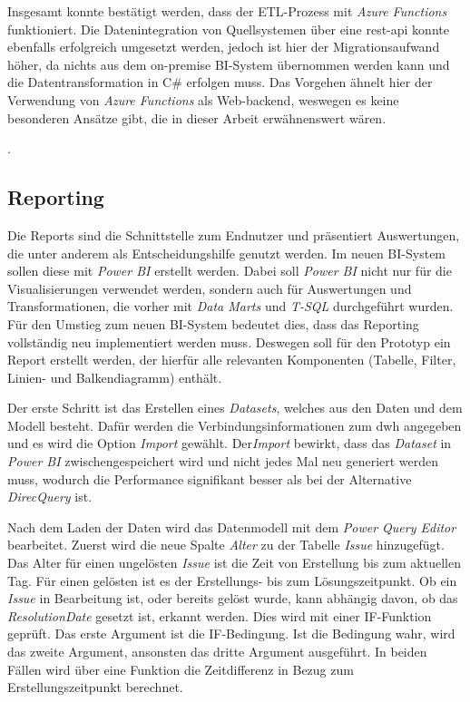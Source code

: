 Insgesamt konnte bestätigt werden, dass der ETL-Prozess mit \textit{Azure Functions} funktioniert. Die Datenintegration von Quellsystemen über eine \ac{rest}-\ac{api} konnte ebenfalls erfolgreich umgesetzt werden, jedoch ist hier der Migrationsaufwand höher, da nichts aus dem on-premise BI-System übernommen werden kann und die Datentransformation in C\# erfolgen muss. Das Vorgehen ähnelt hier der Verwendung von \textit{Azure Functions} als Web-backend, weswegen es keine besonderen Ansätze gibt, die in dieser Arbeit erwähnenswert wären.

\cite[vgl.][]{kurniawan_practical_2019, satapathi_hands-azure_2021, sreeram_azure_2020}.

\subsection{Reporting}
Die Reports sind die Schnittstelle zum Endnutzer und präsentiert Auswertungen, die unter anderem als Entscheidungshilfe genutzt werden. Im neuen BI-System sollen diese mit \textit{Power BI} erstellt werden. Dabei soll \textit{Power BI} nicht nur für die Visualisierungen verwendet werden, sondern auch für Auswertungen und Transformationen, die vorher mit \textit{Data Marts} und \textit{T-SQL} durchgeführt wurden. Für den Umstieg zum neuen BI-System bedeutet dies, dass das Reporting vollständig neu implementiert werden muss. Deswegen soll für den Prototyp ein Report erstellt werden, der hierfür alle relevanten Komponenten (Tabelle, Filter, Linien- und Balkendiagramm) enthält.

Der erste Schritt ist das Erstellen eines \textit{Datasets}, welches aus den Daten und dem Modell besteht. Dafür werden die Verbindungsinformationen zum \ac{dwh} angegeben und es wird die Option \textit{Import} gewählt. Der\textit{Import} bewirkt, dass das \textit{Dataset} in \textit{Power BI} zwischengespeichert wird und nicht jedes Mal neu generiert werden muss, wodurch die Performance signifikant besser als bei der Alternative \textit{DirecQuery} ist.

Nach dem Laden der Daten wird das Datenmodell mit dem \textit{Power Query Editor} bearbeitet. Zuerst wird die neue Spalte \textit{Alter} zu der Tabelle \textit{Issue} hinzugefügt. Das Alter für einen ungelösten \textit{Issue} ist die Zeit von Erstellung bis zum aktuellen Tag. Für einen gelösten ist es der Erstellungs- bis zum Lösungszeitpunkt. Ob ein \textit{Issue} in Bearbeitung ist, oder bereits gelöst wurde, kann abhängig davon, ob das \textit{ResolutionDate} gesetzt ist, erkannt werden. Dies wird mit einer IF-Funktion geprüft. Das erste Argument ist die IF-Bedingung. Ist die Bedingung wahr, wird das zweite Argument, ansonsten das dritte Argument ausgeführt. In beiden Fällen wird über eine Funktion die Zeitdifferenz in Bezug zum Erstellungszeitpunkt berechnet.

